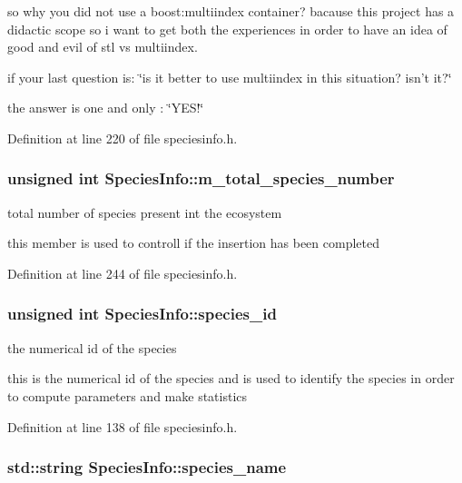 so why you did not use a boost:multiindex container? bacause this project has a didactic scope so i want to get both the experiences in order to have an idea of good and evil of stl vs multiindex.

if your last question is: \char`\"{}is it better to use multiindex in this 
		situation? isn't it?\char`\"{}

the answer is one and only : \char`\"{}YES!\char`\"{} 

Definition at line 220 of file speciesinfo.h.

\hypertarget{structSpeciesInfo_a7b4393176e686a4c1b9e22a5e718744c}{
\subsubsection[{m\_\-total\_\-species\_\-number}]{\setlength{\rightskip}{0pt plus 5cm}unsigned int {\bf SpeciesInfo::m\_\-total\_\-species\_\-number}}}
\label{structSpeciesInfo_a7b4393176e686a4c1b9e22a5e718744c}


total number of species present int the ecosystem 

this member is used to controll if the insertion has been completed 

Definition at line 244 of file speciesinfo.h.

\hypertarget{structSpeciesInfo_a528e7f60fc35e38b4f6b12077b0237bc}{
\subsubsection[{species\_\-id}]{\setlength{\rightskip}{0pt plus 5cm}unsigned int {\bf SpeciesInfo::species\_\-id}}}
\label{structSpeciesInfo_a528e7f60fc35e38b4f6b12077b0237bc}


the numerical id of the species 

this is the numerical id of the species and is used to identify the species in order to compute parameters and make statistics 

Definition at line 138 of file speciesinfo.h.

\hypertarget{structSpeciesInfo_a62ef1cee8c0611138084f8ae6e99a665}{
\subsubsection[{species\_\-name}]{\setlength{\rightskip}{0pt plus 5cm}std::string {\bf SpeciesInfo::species\_\-name}}}
\label{structSpeciesInfo_a62ef1cee8c0611138084f8ae6e99a665}


